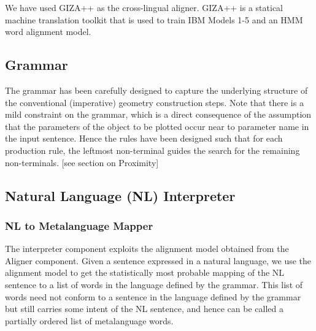 \def\DevnagVersion{2.15}\documentclass[12pt]{article}
\begin{document}
We have used GIZA++ \cite{och2003systematic} as the cross-lingual aligner. GIZA++ is a statical machine translation toolkit that is used to train IBM Models 1-5 and an HMM word alignment model.\\

\subsection{Grammar}
The grammar has been carefully designed to capture the underlying structure of the conventional (imperative) geometry construction steps. Note that there is a mild constraint on the grammar, which is a direct consequence of the assumption that the parameters of the object to be plotted occur near to parameter name in the input sentence. Hence the rules have been designed such that for each production rule, the leftmost non-terminal guides the search for the remaining non-terminals. [see section on Proximity]

\subsection{Natural Language (NL) Interpreter}

\subsubsection{NL to Metalanguage Mapper}
The interpreter component exploits the alignment model obtained from the Aligner component. Given a sentence expressed in a natural language, we use the alignment model to get the statistically most probable mapping of the NL sentence to a list of words in the language defined by the grammar. This list of words need not conform to a sentence in the language defined by the grammar but still carries some intent of the NL sentence, and hence can be called a partially ordered list of metalanguage words.\\
\end{document}
